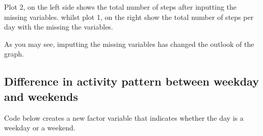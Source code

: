 \documentclass[
]{article}
\newenvironment{Shaded}{\begin{snugshade}}{\end{snugshade}}
\newcommand{\AttributeTok}[1]{\textcolor[rgb]{0.77,0.63,0.00}{#1}}
\newcommand{\FunctionTok}[1]{\textcolor[rgb]{0.00,0.00,0.00}{#1}}
\newcommand{\NormalTok}[1]{#1}
\newcommand{\OtherTok}[1]{\textcolor[rgb]{0.56,0.35,0.01}{#1}}
\newcommand{\SpecialCharTok}[1]{\textcolor[rgb]{0.00,0.00,0.00}{#1}}
\newcommand{\StringTok}[1]{\textcolor[rgb]{0.31,0.60,0.02}{#1}}
\begin{document}
Plot 2, on the left side shows the total number of steps after inputting
the missing variables. whilst plot 1, on the right show the total number
of steps per day with the missing the variables.

As you may see, imputting the missing variables has changed the outlook
of the graph.

\hypertarget{difference-in-activity-pattern-between-weekday-and-weekends}{%
\subsection{Difference in activity pattern between weekday and
weekends}\label{difference-in-activity-pattern-between-weekday-and-weekends}}

Code below creates a new factor variable that indicates whether the day
is a weekday or a weekend.

\begin{Shaded}
\end{Shaded}
\end{document}

